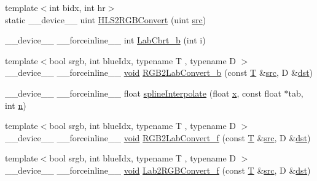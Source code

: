 \begin{DoxyCompactItemize}
\item 
{\footnotesize template$<$int bidx, int hr$>$ }\\static \-\_\-\-\_\-device\-\_\-\-\_\- uint \hyperlink{namespacecv_1_1gpu_1_1device_1_1color__detail_a29713a73dd8cf9e8aceaf839c23e0690}{H\-L\-S2\-R\-G\-B\-Convert} (uint \hyperlink{legacy_8hpp_a371cd109b74033bc4366f584edd3dacc}{src})
\item 
\-\_\-\-\_\-device\-\_\-\-\_\- \-\_\-\-\_\-forceinline\-\_\-\-\_\- int \hyperlink{namespacecv_1_1gpu_1_1device_1_1color__detail_a938617071e124da5b6b1703bb2169520}{Lab\-Cbrt\-\_\-b} (int i)
\item 
{\footnotesize template$<$bool srgb, int blue\-Idx, typename T , typename D $>$ }\\\-\_\-\-\_\-device\-\_\-\-\_\- \-\_\-\-\_\-forceinline\-\_\-\-\_\- \hyperlink{legacy_8hpp_a8bb47f092d473522721002c86c13b94e}{void} \hyperlink{namespacecv_1_1gpu_1_1device_1_1color__detail_afd47e173dea61cac386c9806826720e5}{R\-G\-B2\-Lab\-Convert\-\_\-b} (const \hyperlink{calib3d_8hpp_a3efb9551a871ddd0463079a808916717}{T} \&\hyperlink{legacy_8hpp_a371cd109b74033bc4366f584edd3dacc}{src}, D \&\hyperlink{photo__c_8h_aed13e2a25279b24dc954073233fef7a5}{dst})
\item 
\-\_\-\-\_\-device\-\_\-\-\_\- \-\_\-\-\_\-forceinline\-\_\-\-\_\- float \hyperlink{namespacecv_1_1gpu_1_1device_1_1color__detail_ad426e027c0c364afa19fad92ec237f6d}{spline\-Interpolate} (float \hyperlink{highgui__c_8h_a6150e0515f7202e2fb518f7206ed97dc}{x}, const float $\ast$tab, int \hyperlink{legacy_8hpp_a76f11d9a0a47b94f72c2d0e77fb32240}{n})
\item 
{\footnotesize template$<$bool srgb, int blue\-Idx, typename T , typename D $>$ }\\\-\_\-\-\_\-device\-\_\-\-\_\- \-\_\-\-\_\-forceinline\-\_\-\-\_\- \hyperlink{legacy_8hpp_a8bb47f092d473522721002c86c13b94e}{void} \hyperlink{namespacecv_1_1gpu_1_1device_1_1color__detail_a47e6db9ce003f19e852caabc7c651798}{R\-G\-B2\-Lab\-Convert\-\_\-f} (const \hyperlink{calib3d_8hpp_a3efb9551a871ddd0463079a808916717}{T} \&\hyperlink{legacy_8hpp_a371cd109b74033bc4366f584edd3dacc}{src}, D \&\hyperlink{photo__c_8h_aed13e2a25279b24dc954073233fef7a5}{dst})
\item 
{\footnotesize template$<$bool srgb, int blue\-Idx, typename T , typename D $>$ }\\\-\_\-\-\_\-device\-\_\-\-\_\- \-\_\-\-\_\-forceinline\-\_\-\-\_\- \hyperlink{legacy_8hpp_a8bb47f092d473522721002c86c13b94e}{void} \hyperlink{namespacecv_1_1gpu_1_1device_1_1color__detail_a1021bc1a42a68722a129367c6a333d7b}{Lab2\-R\-G\-B\-Convert\-\_\-f} (const \hyperlink{calib3d_8hpp_a3efb9551a871ddd0463079a808916717}{T} \&\hyperlink{legacy_8hpp_a371cd109b74033bc4366f584edd3dacc}{src}, D \&\hyperlink{photo__c_8h_aed13e2a25279b24dc954073233fef7a5}{dst})

\end{DoxyCompactItemize}
